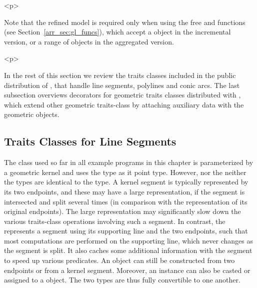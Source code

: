 \begin{ccHtmlOnly}<p>\end{ccHtmlOnly}
Note that the refined model  is required
only when using the free  and
 functions (see Section~\ref{arr_sec:gl_funcs}),
which accept a  object in the incremental version,
or a range of  objects in the aggregated version.

\begin{ccHtmlOnly}<p>\end{ccHtmlOnly}
In the rest of this section we review the traits classes
included in the public distribution of \cgal, that handle line
segments, polylines and conic arcs. The last subsection overviews
decorators for geometric traits classes distributed with \cgal,
which extend other geometric traits-class by attaching auxiliary
data with the geometric objects.

\subsection{Traits Classes for Line Segments}
\label{arr_ssec:tr_segs}
%
The  class used so far
in all example programs in this chapter is parameterized by a
geometric kernel and uses the  type as it
point type. However, nor the  neither the
 types are identical to the
 type. A kernel segment is typically
represented by its two endpoints, and these may have a large
representation, if the segment is intersected and split several
times (in comparison with the representation of its original
endpoints). The large representation may significantly slow down the
various traits-class operations involving such a segment. In contrast,
the  represents a segment using
its supporting line and the two endpoints, such that most computations
are performed on the supporting line, which never changes as the
segment is split. It also caches some additional information with
the segment to speed up various predicates.
An  object can still be constructed from two
endpoints or from a kernel segment. Moreover, an
 instance can also be casted or assigned to a
 object. The two types are thus fully
convertible to one another.

